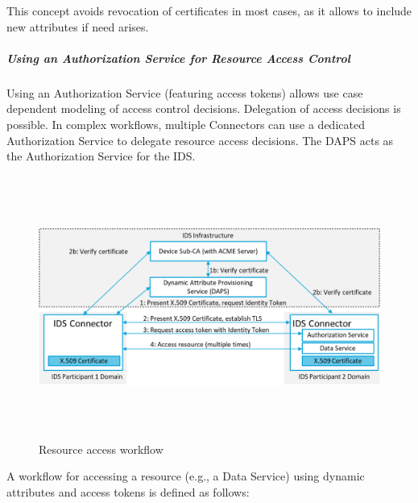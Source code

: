 This concept avoids revocation of certificates in most cases, as it allows to include new attributes if need arises.

\subparagraph*{Using an Authorization Service for Resource Access Control \\}
Using an Authorization Service (featuring access tokens) allows use case dependent modeling of access control decisions. Delegation of access decisions is possible. In complex workflows, multiple Connectors can use a dedicated Authorization Service to delegate resource access decisions. The DAPS acts as the Authorization Service for the IDS.




\begin{figure}[H]
	\begin{Center}
		\includegraphics[width=7.36in,height=3.39in]{./media/image60.png}
		\caption{ Resource access workflow}
		\label{fig:_Resource_access_workflow}
	\end{Center}
\end{figure}




A workflow for accessing a resource (e.g., a Data Service) using dynamic attributes and access tokens is defined as follows:

